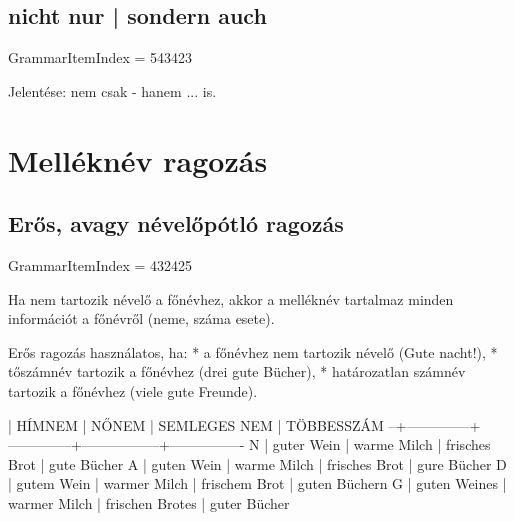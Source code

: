 \documentclass{article}
\newenvironment{desc}{\verbatim}{\endverbatim}
\newenvironment{exmp}{\verbatim}{\endverbatim}
\begin{document}
\begin{exmp}
\end{exmp}

\subsection{nicht nur | sondern auch}

GrammarItemIndex = 543423

\begin{desc}
Jelentése: nem csak - hanem ... is.
\end{desc}

\begin{exmp}
\end{exmp}

\section{Melléknév ragozás}

\subsection{Erős, avagy névelőpótló ragozás}

GrammarItemIndex = 432425

\begin{desc}
Ha nem tartozik névelő a főnévhez, akkor a melléknév tartalmaz minden információt a főnévről (neme, száma esete).

Erős ragozás használatos, ha:
* a főnévhez nem tartozik névelő (Gute nacht!),
* tőszámnév tartozik a főnévhez (drei gute Bücher),
* határozatlan számnév tartozik a főnévhez (viele gute Freunde).

  | HÍMNEM       | NŐNEM        | SEMLEGES NEM    | TÖBBESSZÁM
--+--------------+--------------+-----------------+----------------
N | guter Wein   | warme Milch  | frisches Brot   | gute Bücher
A | guten Wein   | warme Milch  | frisches Brot   | gure Bücher
D | gutem Wein   | warmer Milch | frischem Brot   | guten Büchern
G | guten Weines | warmer Milch | frischen Brotes | guter Bücher
\end{desc}
\end{document}
